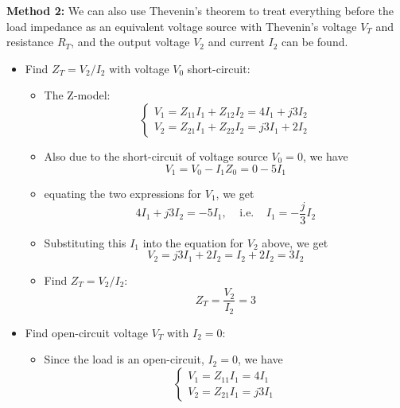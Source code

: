 \documentclass{article}
\begin{document}
{\bf Method 2:} We can also use Thevenin's theorem to treat everything 
before the load impedance as an equivalent voltage source with Thevenin's 
voltage $V_T$ and resistance $R_T$, and the output voltage $V_2$ and 
current $I_2$ can be found.

\begin{itemize}
\item Find $Z_T=V_2/I_2$ with voltage $V_0$ short-circuit:
  \begin{itemize}
  \item The Z-model:
    \begin{equation}
      \left\{ \begin{array}{l} V_1=Z_{11}I_1+Z_{12}I_2=4I_1+j3I_2	\\
        V_2=Z_{21}I_1+Z_{22}I_2=j3I_1+2I_2 \end{array} \right. 
    \end{equation}
  \item Also due to the short-circuit of voltage source $V_0=0$, we have
    \begin{equation}
      V_1=V_0-I_1 Z_0=0-5I_1	
    \end{equation}
  \item equating the two expressions for $V_1$, we get
    \begin{equation}
      4I_1+j3I_2=-5I_1,\;\;\;\;\mbox{i.e.}\;\;\;\;I_1=-\frac{j}{3} I_2	
    \end{equation}
  \item Substituting this $I_1$ into the equation for $V_2$ above, we get
    \begin{equation}
      V_2=j3I_1+2I_2=I_2+2I_2=3I_2 
    \end{equation}
  \item Find $Z_T=V_2/I_2$:
    \begin{equation}
      Z_T=\frac{V_2}{I_2}=3	
    \end{equation}
  \end{itemize}
\item Find open-circuit voltage $V_T$ with $I_2=0$:
  \begin{itemize}
  \item Since the load is an open-circuit, $I_2=0$, we have
    \begin{equation} 
      \left\{ \begin{array}{l} V_1=Z_{11}I_1=4I_1 \\
        V_2=Z_{21}I_1=j3 I_1 \end{array} \right. 
    \end{equation}

\end{itemize}
\end{itemize}
\end{document}
